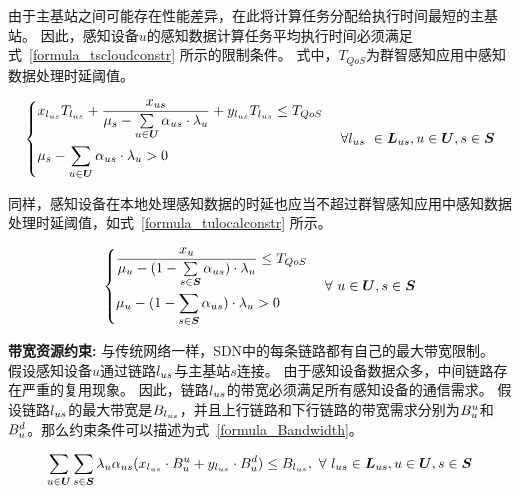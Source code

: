 由于主基站之间可能存在性能差异，在此将计算任务分配给执行时间最短的主基站。
因此，感知设备$u$的感知数据计算任务平均执行时间必须满足式~\eqref{formula_tscloudconstr} 所示的限制条件。
式中，$T_{QoS}$为群智感知应用中感知数据处理时延阈值。

\begin{equation}
\label{formula_tscloudconstr}
  \left\{
    \begin{aligned}
    &x_{l_{us}} T_{l_{us}} + \frac{{x}_{us}}{{\mu}_{s}-\sum\limits_{u \in \boldsymbol{U}}{\alpha}_{us} \cdot {\lambda}_{u}} + y_{l_{us}} T_{l_{us}} \leq T_{QoS}\\
    &{\mu}_{s}-\sum\limits_{u \in \boldsymbol{U}}{\alpha}_{us} \cdot {\lambda}_{u} > 0
    \end{aligned}
  \right.
  \quad \forall l_{us} \  \in \boldsymbol{L}_{us}, u\in \boldsymbol{U}, s \in \boldsymbol{S}
\end{equation}

同样，感知设备在本地处理感知数据的时延也应当不超过群智感知应用中感知数据处理时延阈值，如式~\eqref{formula_tulocalconstr} 所示。

\begin{equation}
\label{formula_tulocalconstr}
  \left\{
    \begin{aligned}
    &\frac{{x}_{u}}{{\mu}_{u} - (1 - \sum\limits_{s \in \boldsymbol{S}} {\alpha}_{us}) \cdot {\lambda}_{u}} \leq T_{QoS}\\
    &{\mu}_{u} - (1 - \sum\limits_{s \in \boldsymbol{S}}{\alpha}_{us}) \cdot {\lambda}_{u} > 0
    \end{aligned}
  \right.
  \quad \forall \ u\in \boldsymbol{U}, s\in \boldsymbol{S}
\end{equation}

\textbf{带宽资源约束:}
与传统网络一样，SDN中的每条链路都有自己的最大带宽限制。
假设感知设备$u$通过链路$l_{us}$与主基站$s$连接。
由于感知设备数据众多，中间链路存在严重的复用现象。
因此，链路$l_{us}$的带宽必须满足所有感知设备的通信需求。
假设链路$l_{us}$的最大带宽是$B_{l_{us}}$，并且上行链路和下行链路的带宽需求分别为$B^{u}_u$和$B^{d}_u$。那么约束条件可以描述为式~\eqref{formula_Bandwidth}。

\vspace{-1em}
\begin{equation}
\label{formula_Bandwidth}
\begin{gathered}
\sum\limits_{u \in \boldsymbol{U}} \sum\limits_{s\in \boldsymbol{S}}\lambdau\aus(\xlus \cdot \Bu + \ylus \cdot \Bd) \leq \Blus, \ 
\forall \ \lus\in \Lus, u\in \boldsymbol{U}, s\in \boldsymbol{S}\\
\end{gathered}
\end{equation}


